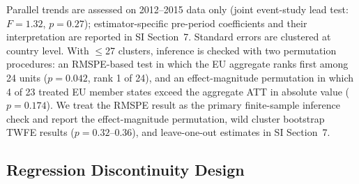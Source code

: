 \documentclass[11pt,a4paper]{article}
\begin{document}
Parallel trends are assessed on 2012--2015 data only (joint event-study lead test: $F = 1.32$, $p = 0.27$\cite{roth2022pretrends}); estimator-specific pre-period coefficients and their interpretation are reported in SI Section~7. Standard errors are clustered at country level. With $\leq$27 clusters, inference is checked with two permutation procedures\cite{abadie2010synthetic}: an RMSPE-based test in which the EU aggregate ranks first among 24 units ($p = 0.042$, rank 1 of 24), and an effect-magnitude permutation in which 4 of 23 treated EU member states exceed the aggregate ATT in absolute value ($p = 0.174$). We treat the RMSPE result as the primary finite-sample inference check and report the effect-magnitude permutation, wild cluster bootstrap TWFE results ($p = 0.32$--$0.36$), and leave-one-out estimates in SI Section~7.

\subsection{Regression Discontinuity Design}
\end{document}
